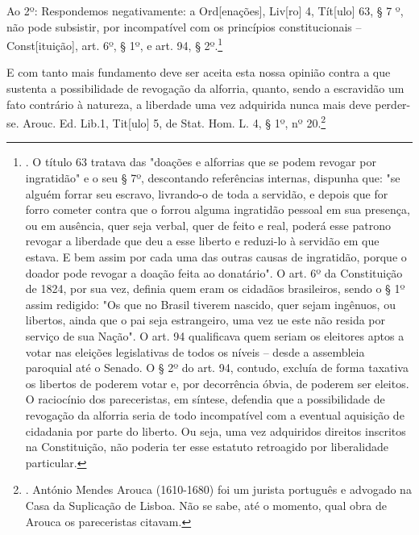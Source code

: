 Ao 2º: Respondemos negativamente: a Ord{[}enações{]}, Liv{[}ro{]} 4,
Tít{[}ulo{]} 63, § 7 º, não pode subsistir, por incompatível com os
princípios constitucionais -- Const{[}ituição{]}, art. 6º, § 1º, e art.
94, § 2º.\footnote{. O título 63 tratava das "doações e alforrias que se
  podem revogar por ingratidão" e o seu § 7º, descontando referências
  internas, dispunha que: "se alguém forrar seu escravo, livrando-o de
  toda a servidão, e depois que for forro cometer contra que o forrou
  alguma ingratidão pessoal em sua presença, ou em ausência, quer seja
  verbal, quer de feito e real, poderá esse patrono revogar a liberdade
  que deu a esse liberto e reduzi-lo à servidão em que estava. E bem
  assim por cada uma das outras causas de ingratidão, porque o doador
  pode revogar a doação feita ao donatário". O art. 6º da Constituição
  de 1824, por sua vez, definia quem eram os cidadãos brasileiros, sendo
  o § 1º assim redigido: "Os que no Brasil tiverem nascido, quer sejam
  ingênuos, ou libertos, ainda que o pai seja estrangeiro, uma vez ue
  este não resida por serviço de sua Nação". O art. 94 qualificava quem
  seriam os eleitores aptos a votar nas eleições legislativas de todos
  os níveis -- desde a assembleia paroquial até o Senado. O § 2º do art.
  94, contudo, excluía de forma taxativa os libertos de poderem votar e,
  por decorrência óbvia, de poderem ser eleitos. O raciocínio dos
  pareceristas, em síntese, defendia que a possibilidade de revogação da
  alforria seria de todo incompatível com a eventual aquisição de
  cidadania por parte do liberto. Ou seja, uma vez adquiridos direitos
  inscritos na Constituição, não poderia ter esse estatuto retroagido
  por liberalidade particular.}

E com tanto mais fundamento deve ser aceita esta nossa opinião contra a
que sustenta a possibilidade de revogação da alforria, quanto, sendo a
escravidão um fato contrário à natureza, a liberdade uma vez adquirida
nunca mais deve perder-se. Arouc. Ed. Lib.1, Tit{[}ulo{]} 5, de Stat.
Hom. L. 4, § 1º, nº 20.\footnote{. António Mendes Arouca (1610-1680) foi
  um jurista português e advogado na Casa da Suplicação de Lisboa. Não
  se sabe, até o momento, qual obra de Arouca os pareceristas citavam.}

